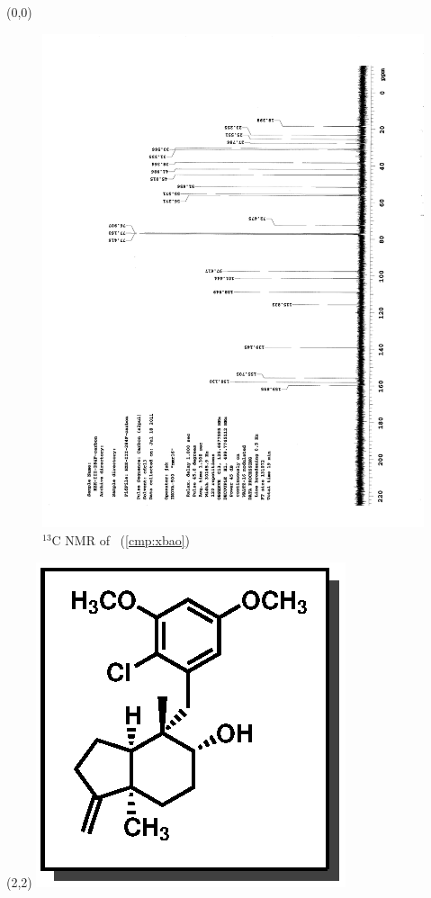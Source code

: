 \clearpage
\begin{textblock}{20}(0,0)
\begin{figure}[htb]
\caption{$^{13}$C NMR of  \CMPxbao\ (\ref{cmp:xbao})}
\includegraphics[scale=0.75, trim = 0mm 0mm 0mm 5mm,
clip]{chp_singlecarbon/images/nmr/xbaoC}
\vspace{-100pt}
\end{figure}
\end{textblock}
\begin{textblock}{1}(2,2)
\includegraphics[scale=0.8, angle=90]{chp_singlecarbon/images/xbao}
\end{textblock}
